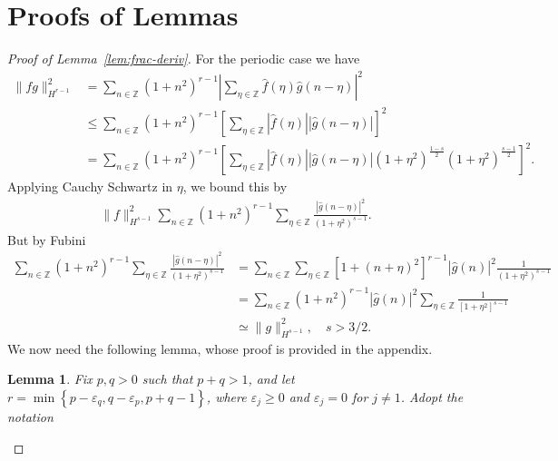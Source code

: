 \documentclass[12pt,reqno]{amsart}
\numberwithin{equation}{section}  %
\numberwithin{figure}{section}
\newcommand{\zz}{\mathbb{Z}}
\newcommand{\wh}{\widehat}
\newcommand{\ee}{\varepsilon}
\newtheorem{lemma}[theorem]{Lemma}
\begin{document}
\section{Proofs of Lemmas} 
\label{sec:pf-lemmas}
%
%
%
\begin{proof}[Proof of Lemma~\ref{lem:frac-deriv}]
For the periodic case we have
%
%
\begin{equation*}
\begin{split}
  \| fg\|_{H^{r-1}}^{2}
  & = \sum_{n \in \zz} (1 + n^{2})^{r-1}| \sum_{\eta \in \zz}
  \wh{f}(\eta) \wh{g}( n - \eta)  |^{2} 
  \\
  & \le \sum_{n \in \zz} (1 + n^{2})^{r-1}\left [ \sum_{\eta \in \zz}
  | \wh{f}(\eta) |  | \wh{g}(n - \eta) | 
   \right ]^{2} 
  \\
  & = \sum_{n \in \zz}  (1 + n^{2})^{r-1}\left [ \sum_{\eta \in \zz}
  | \wh{f}(\eta) |  | \wh{g}(n - \eta) | (1 +
  \eta^{2})^{\frac{1-s}{2}} (1 + \eta^{2})^{\frac{s-1}{2}}
   \right ]^{2}.
  \end{split}
\end{equation*}
%
Applying Cauchy Schwartz in $\eta$, we bound this by
%
%
%
\begin{equation}
  \label{np-key-term}
\begin{split}
  \| f \|_{H^{s-1}}^{2} \sum_{n \in \zz}  (1 + n^{2})^{r-1}\sum_{\eta \in \zz} \frac{|
  \wh{g}(n - \eta) |^{2}}{(1 + \eta^{2})^{s-1}}.
  \end{split}
\end{equation}
%
But by Fubini
%
\begin{equation}
\begin{split}
\label{int-pre-calc-lem}
\sum_{n \in \zz}  (1 + n^{2})^{r-1}\sum_{\eta \in \zz} \frac{|
  \wh{g}(n - \eta) |^{2}}{(1 + \eta^{2})^{s-1}}
  & = \sum_{n \in \zz} \sum_{\eta \in \zz}  [1 + (n + \eta)^{2}]^{r-1}
  |\wh{g}(n)|^{2} \frac{1}{(1 + \eta^{2})^{s-1}}  
   \\
  & =
  \sum_{n \in \zz} (1 + n^{2})^{r-1} |\wh{g}(n)|^{2}\sum_{\eta \in \zz}
\frac{1}{[1 + \eta^{2}]^{s-1}}  
  \\
  & \simeq \| g \|^{2}_{H^{s-1}}, \quad s > 3/2.
  \end{split}
\end{equation}
%
%
We now need the following lemma, whose proof is provided in the appendix.
%
%
\begin{lemma}
	\label{lem:calc}
  Fix $p, q > 0$ such that $p +q >1$, and let $r =\min\left\{p - \ee_{q}, q - \ee_{p}, p+q-1
 \right\}$, where $\ee_{j} \ge 0$ and $\ee_{j} = 0$ for $j \neq 1$. Adopt the notation

\end{lemma}
\end{proof}
\end{document}
